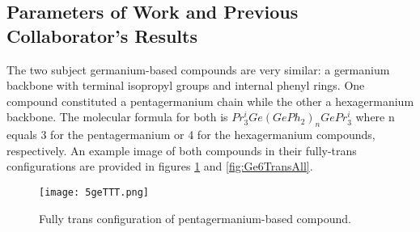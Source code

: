 \subsection{Parameters of Work and Previous Collaborator's Results}

The two subject germanium-based compounds are very similar: a germanium backbone with terminal isopropyl groups and internal phenyl rings. 
One compound constituted a pentagermanium chain while the other a hexagermanium backbone. 
The molecular formula for both is $Pr^{i}_{3}Ge(GePh_{2})_{n}GePr^{i}_{3}$ where n equals 3 for the pentagermanium or 4 for the hexagermanium compounds, respectively.
An example image of both compounds in their fully-trans configurations are provided in figures \ref{fig:Ge5TransAll} and \ref{fig:Ge6TransAll}.

\begin{figure}
	
	\centering
	
	\texttt{[image: 5geTTT.png]}
	
	\caption{Fully trans configuration of pentagermanium-based compound.}
	
	\label{fig:Ge5TransAll}
	
\end{figure}

